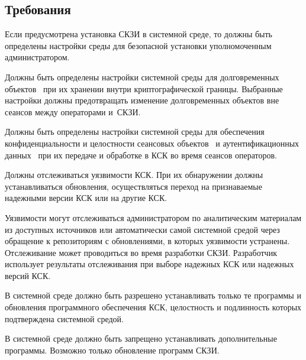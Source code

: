 \subsection{Требования}\label{ES.Reqs}

\label{R.ES.Install} %
Если предусмотрена установка СКЗИ в системной среде, то должны быть определены
настройки среды для безопасной установки уполномоченным администратором.

\label{R.ES.Objects} %
Должны быть определены настройки системной среды
для  долговременных объектов~ 
при их хранении внутри криптографической границы. 
%
Выбранные настройки должны предотвращать 
изменение долговременных объектов вне сеансов между операторами и~СКЗИ.

\label{R.ES.Session} %
Должны быть определены настройки системной среды
для обеспечения конфиденциальности и целостности сеансовых 
объектов~ и аутентификационных 
данных~ при их передаче и  
обработке в КСК во время сеансов операторов.

\label{R.ES.CVE} %
Должны отслеживаться уязвимости КСК. При их обнаружении должны 
устанавливаться обновления, осуществляться переход на признаваемые надежными
версии КСК или на другие КСК.

\begin{note*}
Уязвимости могут отслеживаться администратором по аналитическим материалам из
доступных источников или автоматически самой системной средой через обращение к
репозиториям с обновлениями, в которых уязвимости устранены.
%
Отслеживание может проводиться во время разработки СКЗИ. Разработчик использует
результаты отслеживания при выборе надежных КСК или надежных версий КСК.
\end{note*}

\label{R.ES.AuthCode} %
В системной среде должно быть разрешено устанавливать только те программы и
обновления программного обеспечения КСК, целостность и подлинность которых
подтверждена системной средой.

\label{R.ES.NoCode} %
В системной среде должно быть запрещено устанавливать дополнительные программы.
Возможно только обновление программ СКЗИ.

